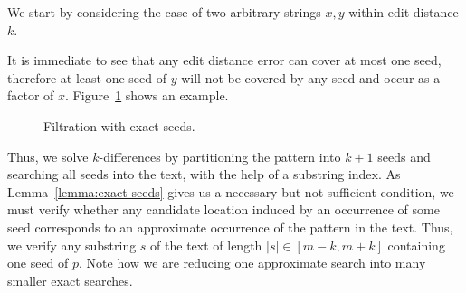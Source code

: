 We start by considering the case of two arbitrary strings $x,y$ within edit distance $k$.
It is immediate to see that any edit distance error can cover at most one seed, therefore at least one seed of $y$ will not be covered by any seed and occur as a factor of $x$.
Figure~\ref{fig:seeds-ext} shows an example.

\begin{figure}[h]
\begin{center}
\caption{Filtration with exact seeds.}
\label{fig:seeds-ext}

\end{center}
\end{figure}

Thus, we solve $k$-differences by partitioning the pattern into $k+1$ seeds and searching all seeds into the text, \eg with the help of a substring index.
As Lemma~\ref{lemma:exact-seeds} gives us a necessary but not sufficient condition, we must verify whether any candidate location induced by an occurrence of some seed corresponds to an approximate occurrence of the pattern in the text.
Thus, we verify any substring $s$ of the text of length $|s| \in [m - k, m + k]$ containing one seed of $p$.
Note how we are reducing one approximate search into many smaller exact searches.


